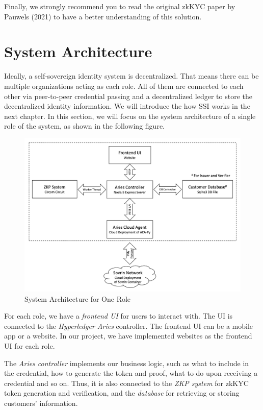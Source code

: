 \documentclass[
]{report}
\begin{document}
Finally, we strongly recommend you to read the original zkKYC paper by
Pauwels (2021) to have a better understanding of this solution.

\section{System Architecture}
Ideally, a self-sovereign identity system is decentralized. That means
there can be multiple organizations acting as each role. All of them
are connected to each other via peer-to-peer credential passing and
a decentralized ledger to store the decentralized identity information.
We will introduce the how SSI works in the next chapter. In this section,
we will focus on the system architecture of a single role of the system,
as shown in the following figure.


\begin{figure}[h]
\centering
\includegraphics[width=14cm]{sys-arch.png}
\caption{System Architecture for One Role}
\end{figure}

For each role, we have a \emph{frontend UI} for users to interact with. The UI
is connected to the \emph{Hyperledger Aries} controller. The frontend UI
can be a mobile app or a website. In our project, we have implemented
websites as the frontend UI for each role.

The \emph{Aries controller} implements our business logic, such as what to
include in the credential, how to generate the token and proof, what
to do upon receiving a credential and so on. Thus, it is also connected
to the \emph{ZKP system} for zkKYC token generation and verification,
and the \emph{database} for retrieving or storing customers' information.
\end{document}
